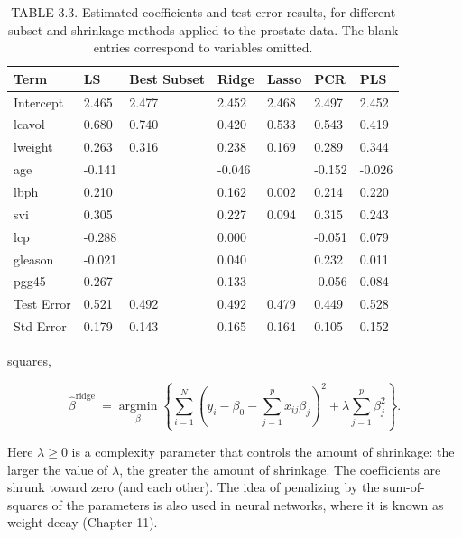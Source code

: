 \documentclass[10pt]{article}
\begin{document}
\begin{table}[h]
\begin{center}
\captionsetup{labelformat=empty}
\caption{TABLE 3.3. Estimated coefficients and test error results, for different subset and shrinkage methods applied to the prostate data. The blank entries correspond to variables omitted.}
\begin{tabular}{|l|l|l|l|l|l|l|}
\hline
Term & LS & Best Subset & Ridge & Lasso & PCR & PLS \\
\hline
Intercept & 2.465 & 2.477 & 2.452 & 2.468 & 2.497 & 2.452 \\
\hline
lcavol & 0.680 & 0.740 & 0.420 & 0.533 & 0.543 & 0.419 \\
\hline
lweight & 0.263 & 0.316 & 0.238 & 0.169 & 0.289 & 0.344 \\
\hline
age & -0.141 &  & -0.046 &  & -0.152 & -0.026 \\
\hline
lbph & 0.210 &  & 0.162 & 0.002 & 0.214 & 0.220 \\
\hline
svi & 0.305 &  & 0.227 & 0.094 & 0.315 & 0.243 \\
\hline
lcp & -0.288 &  & 0.000 &  & -0.051 & 0.079 \\
\hline
gleason & -0.021 &  & 0.040 &  & 0.232 & 0.011 \\
\hline
pgg45 & 0.267 &  & 0.133 &  & -0.056 & 0.084 \\
\hline
Test Error & 0.521 & 0.492 & 0.492 & 0.479 & 0.449 & 0.528 \\
\hline
Std Error & 0.179 & 0.143 & 0.165 & 0.164 & 0.105 & 0.152 \\
\hline
\end{tabular}
\end{center}
\end{table}

squares,


\begin{equation*}
\hat{\beta}^{\text {ridge }}=\underset{\beta}{\operatorname{argmin}}\left\{\sum_{i=1}^{N}\left(y_{i}-\beta_{0}-\sum_{j=1}^{p} x_{i j} \beta_{j}\right)^{2}+\lambda \sum_{j=1}^{p} \beta_{j}^{2}\right\} . \tag{3.41}
\end{equation*}


Here $\lambda \geq 0$ is a complexity parameter that controls the amount of shrinkage: the larger the value of $\lambda$, the greater the amount of shrinkage. The coefficients are shrunk toward zero (and each other). The idea of penalizing by the sum-of-squares of the parameters is also used in neural networks, where it is known as weight decay (Chapter 11).
\end{document}
